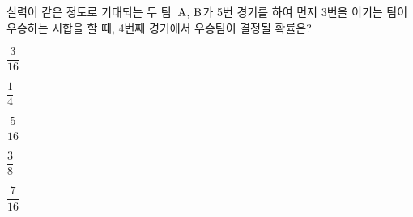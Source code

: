 실력이 같은 정도로 기대되는 두 팀~$\mathrm{A}$, $\mathrm{B}$가 5번 경기를 하여 먼저 3번을 이기는 팀이 우승하는 시합을 할 때, 4번째 경기에서 우승팀이 결정될 확률은? 
\begin{choices32}{\rule[-3ex]{0pt}{8ex}$\dfrac{3}{16}$}{\rule[-3ex]{0pt}{8ex}$\dfrac{1}{4}$}{\rule[-3ex]{0pt}{8ex}$\dfrac{5}{16}$}{\rule[-3ex]{0pt}{8ex}$\dfrac{3}{8}$}{\rule[-3ex]{0pt}{8ex}$\dfrac{7}{16}$}\end{choices32}
